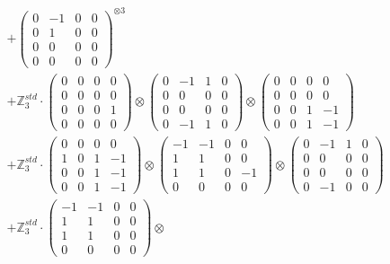 \documentclass{article}
\begin{document}
{\begin{align}
        &+ \label{Rs16-Rc11-Solution-19-c16} \begin{pmatrix} 0 & -1 & 0 & 0 \\ 0 & 1 & 0 & 0 \\ 0 & 0 & 0 & 0 \\ 0 & 0 & 0 & 0 \end{pmatrix}^{\otimes 3} \\
        &+ \label{Rs16-Rc11-Solution-19-c17} \mathbb{Z}_3^{std} \cdot 
            \begin{pmatrix} 0 & 0 & 0 & 0 \\ 0 & 0 & 0 & 0 \\ 0 & 0 & 0 & 1 \\ 0 & 0 & 0 & 0 \end{pmatrix} \otimes 
            \begin{pmatrix} 0 & -1 & 1 & 0 \\ 0 & 0 & 0 & 0 \\ 0 & 0 & 0 & 0 \\ 0 & -1 & 1 & 0 \end{pmatrix} \otimes 
            \begin{pmatrix} 0 & 0 & 0 & 0 \\ 0 & 0 & 0 & 0 \\ 0 & 0 & 1 & -1 \\ 0 & 0 & 1 & -1 \end{pmatrix} \\ 
        &+ \label{Rs16-Rc11-Solution-19-c18} \mathbb{Z}_3^{std} \cdot 
            \begin{pmatrix} 0 & 0 & 0 & 0 \\ 1 & 0 & 1 & -1 \\ 0 & 0 & 1 & -1 \\ 0 & 0 & 1 & -1 \end{pmatrix} \otimes 
            \begin{pmatrix} -1 & -1 & 0 & 0 \\ 1 & 1 & 0 & 0 \\ 1 & 1 & 0 & -1 \\ 0 & 0 & 0 & 0 \end{pmatrix} \otimes 
            \begin{pmatrix} 0 & -1 & 1 & 0 \\ 0 & 0 & 0 & 0 \\ 0 & 0 & 0 & 0 \\ 0 & -1 & 0 & 0 \end{pmatrix} \\ 
        &+ \label{Rs16-Rc11-Solution-19-c19} \mathbb{Z}_3^{std} \cdot 
            \begin{pmatrix} -1 & -1 & 0 & 0 \\ 1 & 1 & 0 & 0 \\ 1 & 1 & 0 & 0 \\ 0 & 0 & 0 & 0 \end{pmatrix} \otimes 

\end{align}}
\end{document}
